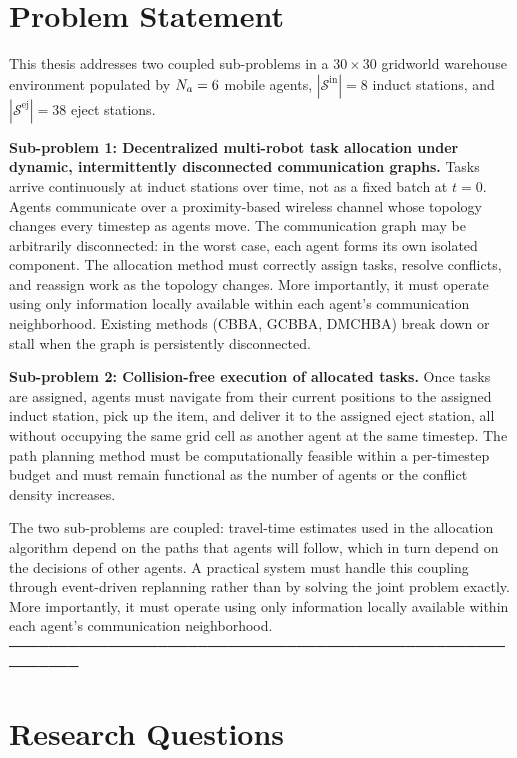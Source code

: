 \section{Problem Statement}
\label{sec:intro_problem}

This thesis addresses two coupled sub-problems in a $30 \times 30$ gridworld
warehouse environment populated by $N_a = 6$ mobile agents,
$|\mathcal{S}^{\text{in}}| = 8$ induct stations, and
$|\mathcal{S}^{\text{ej}}| = 38$ eject stations.

\textbf{Sub-problem 1: Decentralized multi-robot task allocation under dynamic,
intermittently disconnected communication graphs.}
Tasks arrive continuously at induct stations over time, not as a fixed batch at
$t = 0$.
Agents communicate over a proximity-based wireless channel whose topology
changes every timestep as agents move.
The communication graph may be arbitrarily disconnected: in the worst case,
each agent forms its own isolated component.
The allocation method must correctly assign tasks, resolve conflicts, and
reassign work as the topology changes. More importantly, it must operate
using only information locally
available within each agent's communication neighborhood.
Existing methods (CBBA, GCBBA, DMCHBA) break down or stall when the graph is
persistently disconnected.

\textbf{Sub-problem 2: Collision-free execution of allocated tasks.}
Once tasks are assigned, agents must navigate from their current positions to
the assigned induct station, pick up the item, and deliver it to the assigned
eject station, all without occupying the same grid cell as another agent at the
same timestep.
The path planning method must be computationally feasible within a per-timestep
budget and must remain functional as the number of agents or the conflict
density increases.

The two sub-problems are coupled: travel-time estimates used in the allocation
algorithm depend on the paths that agents will follow, which in turn depend on
the decisions of other agents.
A practical system must handle this coupling through event-driven replanning
rather than by solving the joint problem exactly.
More importantly, it must operate
using only information locally
available within each agent's communication neighborhood. ─────────────────────────────────────────────────────────
\section{Research Questions}
\label{sec:intro_questions}

